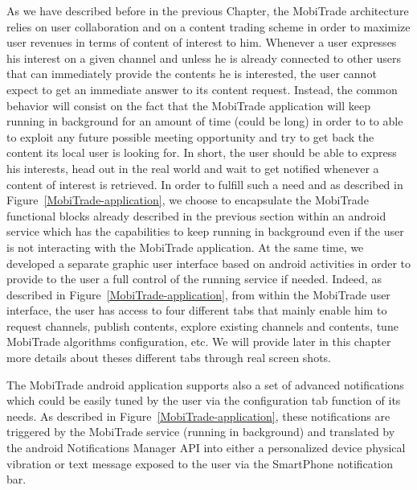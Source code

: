 As we have described before in the previous Chapter, the MobiTrade architecture relies on user collaboration and on a content trading scheme in order to maximize user revenues in terms of content of interest to him. Whenever a user expresses his interest on a given channel and unless he is already connected to other users that can immediately provide the contents he is interested, the user cannot expect to get an immediate answer to its content request. Instead, the common behavior will consist on the fact that the MobiTrade application will keep running in background for an amount of time (could be long) in order to to able to exploit any future possible meeting opportunity and try to get back the content its local user is looking for. In short, the user should be able to express his interests, head out in the real world and wait to get notified whenever a content of interest is retrieved.  In order to fulfill such a need and as described in Figure~\ref{MobiTrade-application}, we choose to encapsulate the MobiTrade functional blocks already described in the previous section within an android service which has the capabilities to keep running in background even if the user is not interacting with the MobiTrade application. At the same time, we developed a separate graphic user interface based on android activities in order to provide to the user a full control of the running service if needed. Indeed, as described in Figure~\ref{MobiTrade-application}, from within the MobiTrade user interface, the user has access to four different tabs that mainly enable him to request channels, publish contents, explore existing channels and contents, tune MobiTrade algorithms configuration, etc. We will provide later in this chapter more details about theses different tabs through real screen shots.

The MobiTrade android application supports also a set of advanced notifications which could be easily tuned by the user via the configuration tab function of its needs. As described in Figure~\ref{MobiTrade-application}, these notifications are triggered by the MobiTrade service (running in background) and translated by the android Notifications Manager API into either a personalized device physical vibration or text message exposed to the user via the SmartPhone notification bar. 

